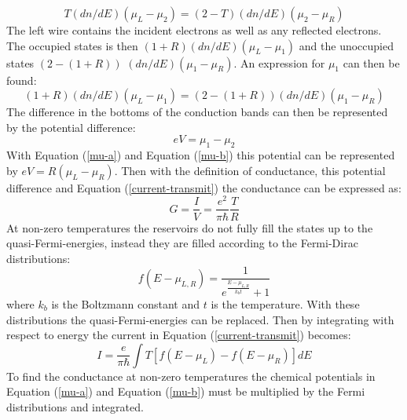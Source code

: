 			\begin{equation}
				T\left(dn/dE\right)\left(\mu_{L}-\mu_{2}\right)=\left(2-T\right)\left(dn/dE\right)\left(\mu_{2}-\mu_{R}\right)
				\label{mu-a}
			\end{equation}
			The left wire contains the incident electrons as well as any reflected electrons. The occupied states is then $\left(1+R\right)\left(dn/dE\right)\left(\mu_{L}-\mu_{1}\right)$ and the unoccupied states $\left(2-\left(1+R\right)\right)$ $\left(dn/dE\right)\left(\mu_{1}-\mu_{R}\right)$. An expression for $\mu_{1}$ can then be found:
			\begin{equation}
				\left(1+R\right)\left(dn/dE\right)\left(\mu_{L}-\mu_{1}\right)=\left(2-\left(1+R\right)\right)\left(dn/dE\right)\left(\mu_{1}-\mu_{R}\right)
				\label{mu-b}
			\end{equation}
			The difference in the bottoms of the conduction bands can then be represented by the potential difference:
			\begin{equation}
				eV=\mu_{1}-\mu_{2}
			\end{equation}
			With Equation (\ref{mu-a}) and Equation (\ref{mu-b}) this potential can be represented by $eV=R\left(\mu_{L}-\mu_{R}\right)$. Then with the definition of conductance, this potential difference and Equation (\ref{current-transmit}) the conductance can be expressed as:
			\begin{equation}
				G=\frac{I}{V}=\frac{e^{2}}{\pi\hbar}\frac{T}{R}
				\label{GTR}
			\end{equation}
			At non-zero temperatures the reservoirs do not fully fill the states up to the quasi-Fermi-energies, instead they are filled according to the Fermi-Dirac distributions:
			\begin{equation}
				f\left(E-\mu_{L,R}\right)=\frac{1}{e^{\frac{E-\mu_{L,R}}{k_{b}t}}+1}
			\end{equation}
			where $k_{b}$ is the Boltzmann constant and $t$ is the temperature. With these distributions the quasi-Fermi-energies can be replaced. Then by integrating with respect to energy the current in Equation (\ref{current-transmit}) becomes:
			\begin{equation}
				I=\frac{e}{\pi\hbar}\int T\left[f\left(E-\mu_{L}\right)-f\left(E-\mu_{R}\right)\right] dE
				\label{current-temp}
			\end{equation}
			To find the conductance at non-zero temperatures the chemical potentials in Equation (\ref{mu-a}) and Equation (\ref{mu-b}) must be multiplied by the Fermi distributions and integrated.

